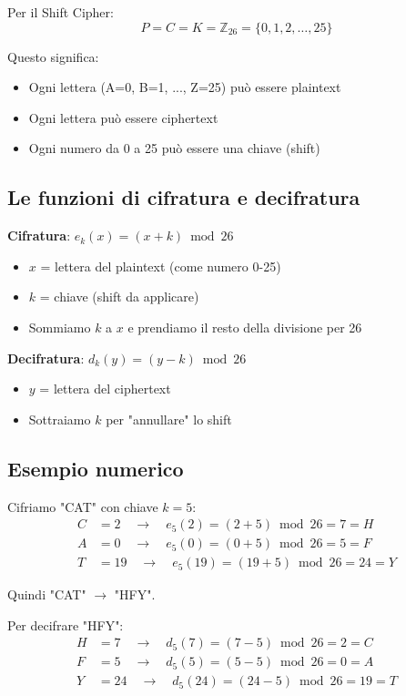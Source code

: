 Per il Shift Cipher:
\[P = C = K = \mathbb{Z}_{26} = \{0, 1, 2, \ldots, 25\}\]

Questo significa:
\begin{itemize}
    \item Ogni lettera (A=0, B=1, ..., Z=25) può essere plaintext
    \item Ogni lettera può essere ciphertext
    \item Ogni numero da 0 a 25 può essere una chiave (shift)
\end{itemize}

\subsection{Le funzioni di cifratura e decifratura}

\textbf{Cifratura}: $e_k(x) = (x + k) \bmod 26$
\begin{itemize}
    \item $x$ = lettera del plaintext (come numero 0-25)
    \item $k$ = chiave (shift da applicare)  
    \item Sommiamo $k$ a $x$ e prendiamo il resto della divisione per 26
\end{itemize}

\textbf{Decifratura}: $d_k(y) = (y - k) \bmod 26$  
\begin{itemize}
    \item $y$ = lettera del ciphertext
    \item Sottraiamo $k$ per "annullare" lo shift
\end{itemize}

\subsection{Esempio numerico}
Cifriamo "CAT" con chiave $k = 5$:
\begin{align}
C &= 2 \quad \to \quad e_5(2) = (2 + 5) \bmod 26 = 7 = H \\
A &= 0 \quad \to \quad e_5(0) = (0 + 5) \bmod 26 = 5 = F \\  
T &= 19 \quad \to \quad e_5(19) = (19 + 5) \bmod 26 = 24 = Y
\end{align}

Quindi "CAT" $\to$ "HFY".

Per decifrare "HFY":
\begin{align}
H &= 7 \quad \to \quad d_5(7) = (7 - 5) \bmod 26 = 2 = C \\
F &= 5 \quad \to \quad d_5(5) = (5 - 5) \bmod 26 = 0 = A \\
Y &= 24 \quad \to \quad d_5(24) = (24 - 5) \bmod 26 = 19 = T  
\end{align}


